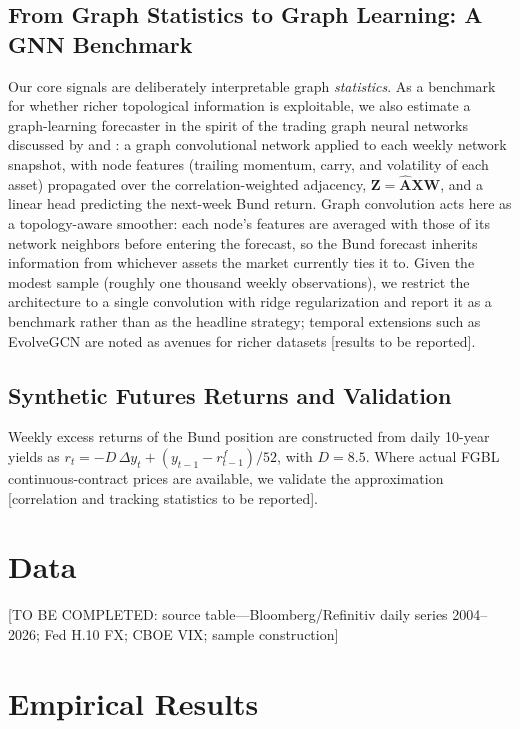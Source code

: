 \documentclass[12pt]{article}
\begin{document}
\subsection{From Graph Statistics to Graph Learning: A GNN Benchmark}\label{sec:gnn}

Our core signals are deliberately interpretable graph \emph{statistics}. As a benchmark for whether richer topological information is exploitable, we also estimate a graph-learning forecaster in the spirit of the trading graph neural networks discussed by \citet{konstantinov2025unsupervised} and \citet{wu2025trading}: a graph convolutional network \citep{kipf2017semi} applied to each weekly network snapshot, with node features (trailing momentum, carry, and volatility of each asset) propagated over the correlation-weighted adjacency, $\mathbf{Z} = \hat{\mathbf{A}}\mathbf{X}\mathbf{W}$, and a linear head predicting the next-week Bund return. Graph convolution acts here as a topology-aware smoother: each node's features are averaged with those of its network neighbors before entering the forecast, so the Bund forecast inherits information from whichever assets the market currently ties it to. Given the modest sample (roughly one thousand weekly observations), we restrict the architecture to a single convolution with ridge regularization and report it as a benchmark rather than as the headline strategy; temporal extensions such as EvolveGCN \citep{pareja2020evolvegcn} are noted as avenues for richer datasets [results to be reported].

\subsection{Synthetic Futures Returns and Validation}\label{sec:synthetic}

Weekly excess returns of the Bund position are constructed from daily 10-year yields as
$r_t = -D\,\Delta y_t + (y_{t-1} - r^{f}_{t-1})/52$, with $D=8.5$. Where actual FGBL continuous-contract prices are available, we validate the approximation [correlation and tracking statistics to be reported].

\section{Data}\label{sec:data}

[TO BE COMPLETED: source table---Bloomberg/Refinitiv daily series 2004--2026; Fed H.10 FX; CBOE VIX; sample construction]

\section{Empirical Results}\label{sec:results}
\end{document}
